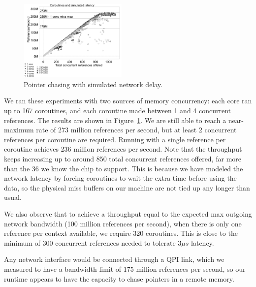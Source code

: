\documentclass[10pt,nocopyrightspace,preprint]{sigplanconf}
\begin{document}
\begin{figure}[h]
  \begin{center}
    \includegraphics[width=0.47\textwidth]{figures/multi-green-delay7800-edited.pdf}
  \end{center}
  \caption{Pointer chasing with simulated network delay.}
  \label{fig:network-delay}
\end{figure}

We ran these experiments with two sources of memory concurrency: each
core ran up to 167 coroutines, and each coroutine made between 1 and 4
concurrent references. The results are shown in
Figure~\ref{fig:network-delay}. We are still able to reach a
near-maximum rate of 273 million references per second, but at least 2
concurrent references per coroutine are required. Running with a single
reference per coroutine achieves 236 million references per
second. Note that the throughput keeps increasing up to around 850 total concurrent references offered, far more than the 36 we know the chip to support. This is because we have modeled the network latency by forcing coroutines to wait the extra time before using the data, so the physical miss buffers on our machine are not tied up any longer than usual.

We also observe that to achieve a throughput equal to the expected max outgoing network bandwidth (100 million references per second),  when there is only one reference per context available, we require 320 coroutines. This is close to the minimum of 300 concurrent references needed to tolerate $3 \mu s$ latency.

Any network interface would be connected through a QPI link,
which we measured to have a bandwidth limit of 175 million references
per second, so our runtime appears to have the capacity to chase pointers
in a remote memory. 

\end{document}

